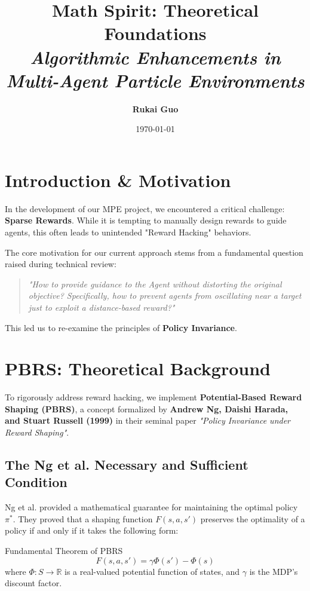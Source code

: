 \documentclass[11pt,a4paper]{article}
\title{
    \vspace{-2.5cm}
    \color{DeepBlue}\Huge\textbf{Math Spirit: Theoretical Foundations} \\
    \large \textit{Algorithmic Enhancements in Multi-Agent Particle Environments}
}
\author{\textbf{Rukai Guo}}
\date{\today}
\begin{document}
\maketitle

\section{Introduction \& Motivation}
In the development of our MPE project, we encountered a critical challenge: \textbf{Sparse Rewards}. While it is tempting to manually design rewards to guide agents, this often leads to unintended "Reward Hacking" behaviors.

The core motivation for our current approach stems from a fundamental question raised during technical review: 
\begin{quote}
    \textit{"How to provide guidance to the Agent without distorting the original objective? Specifically, how to prevent agents from oscillating near a target just to exploit a distance-based reward?"}
\end{quote}
This led us to re-examine the principles of \textbf{Policy Invariance}.

\section{PBRS: Theoretical Background}
To rigorously address reward hacking, we implement \textbf{Potential-Based Reward Shaping (PBRS)}, a concept formalized by \textbf{Andrew Ng, Daishi Harada, and Stuart Russell (1999)} in their seminal paper \textit{"Policy Invariance under Reward Shaping"}.

\subsection{The Ng et al. Necessary and Sufficient Condition}
Ng et al. provided a mathematical guarantee for maintaining the optimal policy $\pi^*$. They proved that a shaping function $F(s, a, s')$ preserves the optimality of a policy if and only if it takes the following form:

\begin{mathspiritbox}{Fundamental Theorem of PBRS}
    \[ F(s, a, s') = \gamma \Phi(s') - \Phi(s) \]
    where $\Phi: S \to \mathbb{R}$ is a real-valued potential function of states, and $\gamma$ is the MDP's discount factor.
\end{mathspiritbox}
\end{document}
